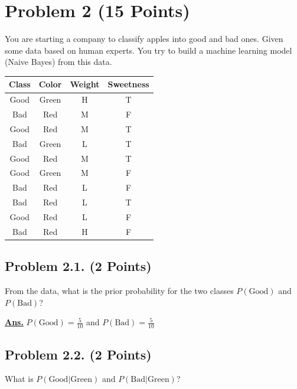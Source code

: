 \documentclass[12pt, a4paper]{article}
\begin{document}
    \pagebreak

    \section{Problem 2 (15 Points)}
        You are starting a company to classify apples into good and bad ones. Given some data based on human experts.
        You try to build a machine learning model (Naive Bayes) from this data.

        \begin{table}[h]
            \centering
            \begin{tabular}{|c|c|c|c|}
                \hline
                \textbf{Class} & \textbf{Color} & \textbf{Weight} & \textbf{Sweetness} \\
                \hline \hline
                Good & Green & H & T \\
                Bad  & Red   & M & F \\
                Good & Red   & M & T \\
                Bad  & Green & L & T \\
                Good & Red   & M & T \\
                Good & Green & M & F \\
                Bad  & Red   & L & F \\
                Bad  & Red   & L & T \\
                Good & Red   & L & F \\
                Bad  & Red   & H & F \\
                \hline
            \end{tabular}
        \end{table}

        \subsection{Problem 2.1. (2 Points)}
            From the data, what is the prior probability for the two classes $P(\text{Good})$ and $P(\text{Bad})$?

            \vspace{1em}

            \noindent \underline{\textbf{Ans.}} $P(\text{Good}) = \frac{5}{10}$ and $P(\text{Bad}) = \frac{5}{10}$

        \subsection{Problem 2.2. (2 Points)}
            What is $P(\text{Good} | \text{Green})$ and $P(\text{Bad}| \text{Green})$?
\end{document}
